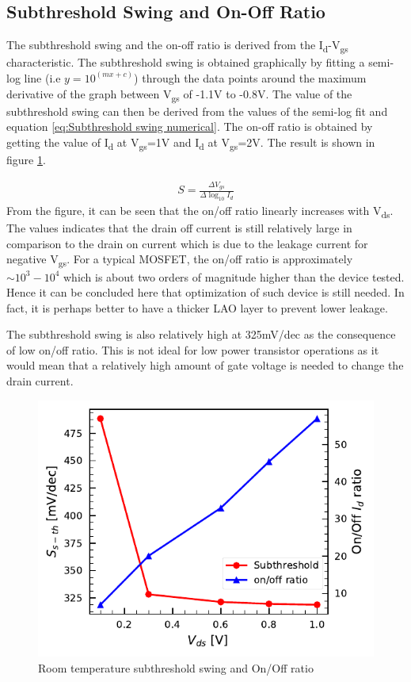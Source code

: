 \documentclass[11pt,a4paper]{report}
\begin{document}
\subsection{Subthreshold Swing and On-Off Ratio} \label{sec:Sth-On/off RoomT}
The subthreshold swing and the on-off ratio is derived from the I\textsubscript{d}-V\textsubscript{gs} characteristic. The subthreshold swing is obtained graphically by fitting a semi-log line (i.e $y = 10^{(mx+c)}$) through the data points around the maximum derivative of the graph between V\textsubscript{gs} of -1.1V to -0.8V. The value of the subthreshold swing can then be derived from the values of the semi-log fit and equation \ref{eq:Subthreshold swing numerical}. The on-off ratio is obtained by getting the value of I\textsubscript{d} at V\textsubscript{gs}=1V and I\textsubscript{d} at V\textsubscript{gs}=2V. The result is shown in figure \ref{fig:Subth-OnOff-RoomTemp}. 

\begin{align}\label{eq:Subthreshold swing numerical}
    S = \frac{\Delta V_{gs}}{\Delta \log_{10}I_d}
\end{align}
From the figure, it can be seen that the on/off ratio linearly increases with V\textsubscript{ds}. The values indicates that the drain off current is still relatively large in comparison to the drain on current which is due to the leakage current for negative V\textsubscript{gs}. For a typical MOSFET, the on/off ratio is approximately $\sim 10^3-10^4$\cite{hu_2010} which is about two orders of magnitude higher than the device tested. Hence it can be concluded here that optimization of such device is still needed. In fact, it is perhaps better to have a thicker LAO layer to prevent lower leakage.

The subthreshold swing is also relatively high at 325mV/dec as the consequence of low on/off ratio. This is not ideal for low power transistor operations as it would mean that a relatively high amount of gate voltage is needed to change the drain current. 

\begin{figure}[!h]
    \centering
    \includegraphics[scale=1]{Figures/Batch2/Dev16_batch2_Subth-on-off.pdf}
    \caption{Room temperature subthreshold swing and On/Off ratio}
    \label{fig:Subth-OnOff-RoomTemp}
\end{figure}
\end{document}
